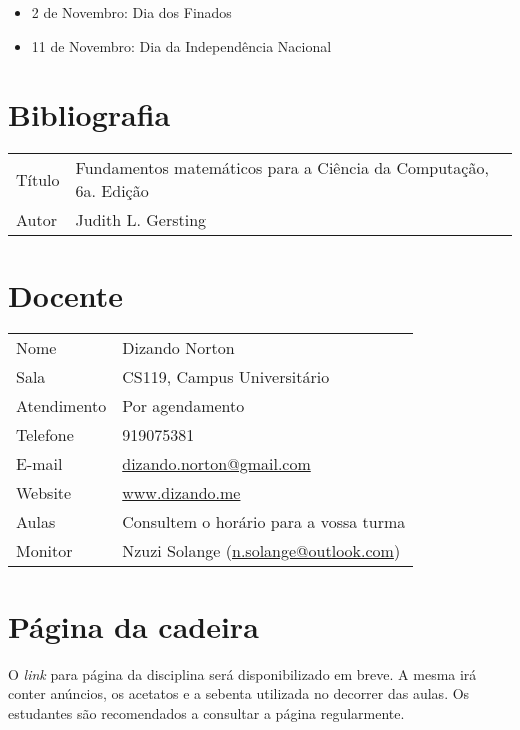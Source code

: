 \begin{itemize}
  \item 2 de Novembro: Dia dos Finados
  \item 11 de Novembro: Dia da Independência Nacional
\end{itemize}

\section*{Bibliografia}

\begin{table}[H]
	\begin{tabular}{ll}%
		Título & Fundamentos matemáticos para a Ciência da Computação, 6a. Edição\\
		Autor & Judith L. Gersting\\
	\end{tabular}
\end{table}

\section*{Docente}

\begin{table}[H]
	\begin{tabular}{ll}%
		Nome 			& Dizando Norton \\ 
	    Sala			& CS119, Campus Universitário\\
	    Atendimento 	& Por agendamento \\
	    Telefone		& 919075381\\
	    E-mail			& \url{dizando.norton@gmail.com}\\
	    Website			& \url{www.dizando.me}\\
	    Aulas 			& Consultem o horário para a vossa turma\\
	    Monitor			& Nzuzi Solange (\url{n.solange@outlook.com})\\
	\end{tabular}
\end{table}

\section*{Página da cadeira}

O \emph{link} para página da disciplina será disponibilizado em breve. 
A mesma irá conter anúncios, os acetatos e a sebenta utilizada no decorrer das
aulas. Os estudantes são recomendados a consultar a página regularmente.





